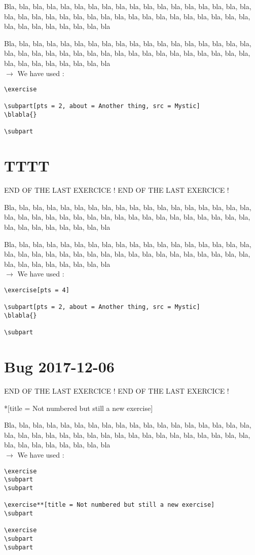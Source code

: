 \documentclass[12pt]{article}
\newcommand\blabla{%
		\noindent Bla, bla, bla, bla, bla, bla, bla, bla, bla, bla, bla,
		bla, bla, bla, bla, bla, bla, bla, bla, bla, bla, bla,
		bla, bla, bla, bla, bla, bla, bla, bla, bla, bla, bla,
		bla, bla, bla, bla, bla, bla, bla, bla, bla, bla, bla
	}
\newcommand\codeused{
		\blabla{} \medskip  \\ \noindent $\rightarrow$ We have used :
	}
\begin{document}
\exercise
   
\subpart[pts = 2, about = Another thing, src = Mystic]
\blabla{}

\subpart

\codeused{}

\begin{verbatim}
\exercise
      
\subpart[pts = 2, about = Another thing, src = Mystic]
\blabla{}

\subpart
\end{verbatim}



\newpage\section{TTTT}

\noindent END OF THE LAST EXERCICE ! END OF THE LAST EXERCICE !

\exercise[pts = 4]
      
\subpart[pts = 2, about = Another thing, src = Mystic]
\blabla{}

\subpart

\codeused{}

\begin{verbatim}
\exercise[pts = 4]
      
\subpart[pts = 2, about = Another thing, src = Mystic]
\blabla{}

\subpart
\end{verbatim}



\newpage\section{Bug 2017-12-06}

\noindent END OF THE LAST EXERCICE ! END OF THE LAST EXERCICE !

\exercise
\subpart
\subpart
      
\exercise**[title = Not numbered but still a new exercise]
\subpart

\exercise
\subpart
\subpart
      

\codeused{}

\begin{verbatim}
\exercise
\subpart
\subpart
      
\exercise**[title = Not numbered but still a new exercise]
\subpart

\exercise
\subpart
\subpart
\end{verbatim}
\end{document}
